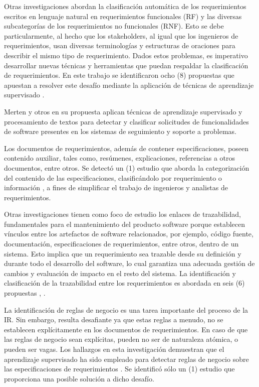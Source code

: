 \documentclass[journal]{IEEEtran}
\begin{document}
Otras investigaciones abordan la clasificación automática de los requerimientos escritos en lenguaje natural en requerimientos funcionales (RF) y las diversas subcategorías de los requerimientos no funcionales (RNF). Esto se debe particularmente, al hecho que los stakeholders, al igual que los ingenieros de requerimientos, usan diversas terminologías y estructuras de oraciones para describir el mismo tipo de requerimiento. Dados estos problemas, es imperativo desarrollar nuevas técnicas y herramientas que puedan respaldar la clasificación de requerimientos. En este trabajo se identificaron ocho (8) propuestas que apuestan a resolver este desafío mediante la aplicación de técnicas de aprendizaje supervisado \cite{li2017identifying,Jindal20162027,kurtanovic2017automatically,dekhtyar2017re,abad2017works,Slankas2013,Slankas2013a}.

Merten y otros \cite{Merten2016} en su propuesta aplican técnicas de aprendizaje supervisado y procesamiento de textos para detectar y clasificar solicitudes de funcionalidades de software presentes en los sistemas de seguimiento y soporte a problemas.

Los documentos de requerimientos, además de contener especificaciones, poseen contenido auxiliar, tales como, resúmenes, explicaciones, referencias a otros documentos, entre otros. Se detectó un (1) estudio que aborda la categorización del contenido de las especificaciones, clasificándolo por requerimiento o información \cite{winkler2016automatic}, a fines de simplificar el trabajo de ingenieros y analistas de requerimientos.

Otras investigaciones tienen como foco de estudio los enlaces de trazabilidad, fundamentales para el mantenimiento del producto software porque establecen vínculos entre los artefactos de software relacionados, por ejemplo, código fuente, documentación, especificaciones de requerimientos, entre otros, dentro de un sistema. Esto implica que un requerimiento sea trazable desde su definición y durante todo el desarrollo del software, lo cual garantiza una adecuada gestión de cambios y evaluación de impacto en el resto del sistema. La identificación y clasificación de la trazabilidad entre los requerimientos es abordada en seis (6) propuestas \cite{Li201725}, \cite{Cleland-Huang2010,gokyer2008non,Mills2017,Sardinha2013,AtasM.2018}.

La identificación de reglas de negocio es una tarea importante del proceso de la IR. Sin embargo, resulta desafiante ya que estas reglas a menudo, no se establecen explícitamente en los documentos de requerimientos. En caso de que las reglas de negocio sean explícitas, pueden no ser de naturaleza atómica, o pueden ser vagas. Los hallazgos en esta investigación demuestran que el aprendizaje supervisado ha sido empleado para detectar reglas de negocio sobre las especificaciones de requerimientos \cite{sharma2014automated}. Se identificó sólo un (1) estudio que proporciona una posible solución a dicho desafío.
\end{document}
